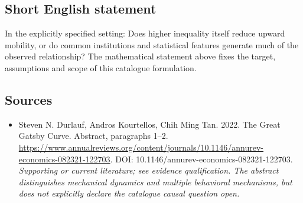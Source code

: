\documentclass[11pt]{article}
\begin{document}
\subsection{Short English statement}
In the explicitly specified setting: Does higher inequality itself reduce upward mobility, or do common institutions and statistical features generate much of the observed relationship? The mathematical statement above fixes the target, assumptions and scope of this catalogue formulation.

\subsection{Sources}
\begin{itemize}\raggedright
\item[\textnormal{[S1]}]\hypertarget{source:30007650:1}{} Steven N. Durlauf, Andros Kourtellos, Chih Ming Tan. 2022. The Great Gatsby Curve. Abstract, paragraphs 1–2.
\url{https://www.annualreviews.org/content/journals/10.1146/annurev-economics-082321-122703}.
DOI: 10.1146/annurev-economics-082321-122703.
{\small\textit{Supporting or current literature; see evidence qualification. The abstract distinguishes mechanical dynamics and multiple behavioral mechanisms, but does not explicitly declare the catalogue causal question open.}}
\end{itemize}
\end{document}
